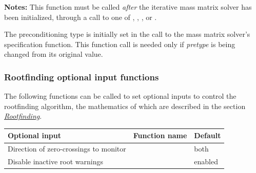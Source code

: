 \documentclass[letterpaper,10pt,english]{sphinxmanual}
\begin{document}
\begin{fulllineitems}
\textbf{Notes:} This function must be called \emph{after} the iterative mass
matrix solver has been initialized, through a call to one of
{\hyperref[c_interface/User_callable:ARKMassSpgmr]{}}, {\hyperref[c_interface/User_callable:ARKMassSpbcg]{}},
{\hyperref[c_interface/User_callable:ARKMassSptfqmr]{}}, {\hyperref[c_interface/User_callable:ARKMassSpfgmr]{}} or
{\hyperref[c_interface/User_callable:ARKMassPcg]{}}.

The preconditioning type is initially set in the call to
the mass matrix solver's specification function.  This function
call is needed only if \emph{pretype} is being changed from its original
value.

\end{fulllineitems}



\subsubsection{Rootfinding optional input functions}
\label{c_interface/User_callable:rootfinding-optional-input-functions}
The following functions can be called to set optional inputs to
control the rootfinding algorithm, the mathematics of which are
described in the section {\hyperref[Mathematics:mathematics-rootfinding]{\emph{Rootfinding}}}.

\begin{tabulary}{\linewidth}{|L|L|L|}
\hline
\textbf{\relax 
Optional input
} & \textbf{\relax 
Function name
} & \textbf{\relax 
Default
}\\\hline

Direction of zero-crossings to monitor
 & 
{\hyperref[c_interface/User_callable:ARKodeSetRootDirection]{}}
 & 
both
\\\hline

Disable inactive root warnings
 & 
{\hyperref[c_interface/User_callable:ARKodeSetNoInactiveRootWarn]{}}
 & 
enabled
\\\hline
\end{tabulary}

\end{document}
